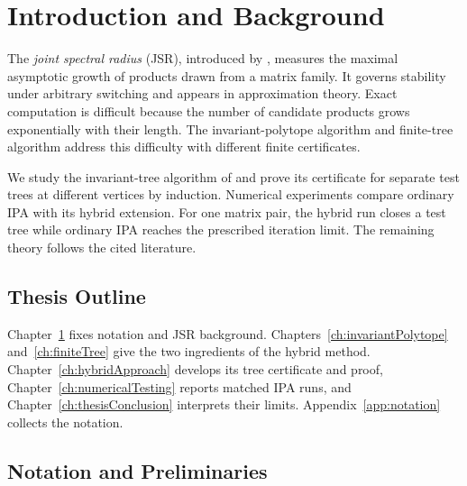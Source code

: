 \chapter{Introduction and Background}
\label{ch:introduction}

The \emph{joint spectral radius} (JSR), introduced by \citet{RotaStrang1960NoteJSR}, measures the maximal asymptotic growth of products drawn from a matrix family.
It governs stability under arbitrary switching and appears in approximation theory.
Exact computation is difficult because the number of candidate products grows exponentially with their length.
The invariant-polytope algorithm \citep{GuglielmiProtasov2013ExactComputationJSR} and finite-tree algorithm \citep{MoellerReif2014TreeBasedJSR} address this difficulty with different finite certificates.

We study the invariant-tree algorithm of \citet{MejstrikReif2025HybridApproachJSR} and prove its certificate for separate test trees at different vertices by induction.
Numerical experiments compare ordinary IPA with its hybrid extension.
For one matrix pair, the hybrid run closes a test tree while ordinary IPA reaches the prescribed iteration limit.
The remaining theory follows the cited literature.

\section*{Thesis Outline}
Chapter~\ref{ch:introduction} fixes notation and JSR background.
Chapters~\ref{ch:invariantPolytope} and~\ref{ch:finiteTree} give the two ingredients of the hybrid method.
Chapter~\ref{ch:hybridApproach} develops its tree certificate and proof, Chapter~\ref{ch:numericalTesting} reports matched IPA runs, and Chapter~\ref{ch:thesisConclusion} interprets their limits.
Appendix~\ref{app:notation} collects the notation.

\section{Notation and Preliminaries}
\label{sec:introPreliminaries}

